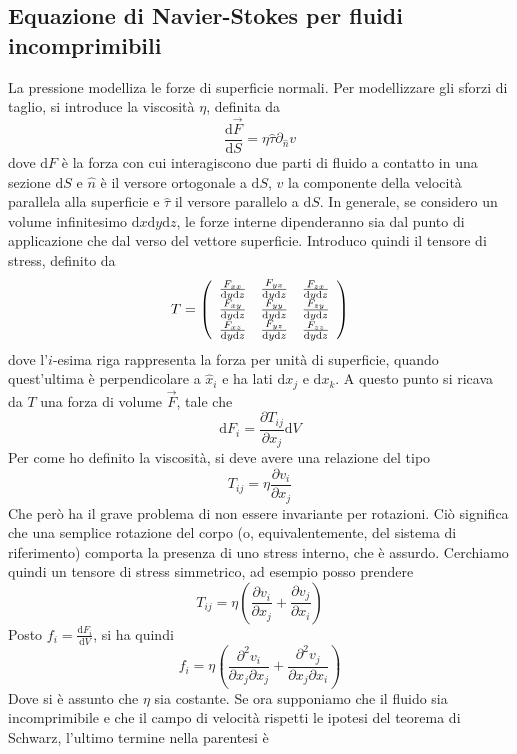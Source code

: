 \documentclass[a4paper,11pt]{article}
\begin{document}
\subsection{Equazione di Navier-Stokes per fluidi incomprimibili}
La pressione modelliza le forze di superficie normali. Per modellizzare gli sforzi di taglio, si introduce la viscosità $\eta$, definita da
\[\frac{\mathrm{d}\vec F}{\mathrm{d}S}=\eta\hat{\tau}\partial_{\hat n}v\]
dove $\mathrm{d}F$ è la forza con cui interagiscono due parti di fluido a contatto in una sezione $\mathrm{d}S$ e $\hat n$ è il versore ortogonale a $\mathrm{d}S$, $v$ la componente della velocità parallela alla superficie e $\hat{\tau}$ il versore parallelo a $\mathrm{d}S$. In generale, se considero un volume infinitesimo $\mathrm{d}x\mathrm{d}y\mathrm{d}z$, le forze interne dipenderanno sia dal punto di applicazione che dal verso del vettore superficie. Introduco quindi il tensore di stress, definito da
\[T=\left(\begin{array}{c c c}
\frac{F_{xx}}{\mathrm{d}y\mathrm{d}z} & \frac{F_{yx}}{\mathrm{d}y\mathrm{d}z} & \frac{F_{zx}}{\mathrm{d}y\mathrm{d}z} \\
\frac{F_{xy}}{\mathrm{d}y\mathrm{d}z} & \frac{F_{yy}}{\mathrm{d}y\mathrm{d}z} & \frac{F_{zy}}{\mathrm{d}y\mathrm{d}z} \\
\frac{F_{xz}}{\mathrm{d}y\mathrm{d}z} & \frac{F_{yz}}{\mathrm{d}y\mathrm{d}z} & \frac{F_{zz}}{\mathrm{d}y\mathrm{d}z} \end{array}\right)\]
dove l'$i$-esima riga rappresenta la forza per unità di superficie, quando quest'ultima è perpendicolare a $\hat{x}_i$ e ha lati $\mathrm{d}x_j$ e $\mathrm{d}x_k$. A questo punto si ricava da $T$ una forza di volume $\vec F$, tale che
\[\mathrm{d}F_i=\frac{\partial T_{ij}}{\partial x_j}\mathrm{d}V\]
Per come ho definito la viscosità, si deve avere una relazione del tipo
\[T_{ij}=\eta\frac{\partial v_i}{\partial x_j}\]
Che però ha il grave problema di non essere invariante per rotazioni. Ciò significa che una semplice rotazione del corpo (o, equivalentemente, del sistema di riferimento) comporta la presenza di uno stress interno, che è assurdo. Cerchiamo quindi un tensore di stress simmetrico, ad esempio posso prendere
\[T_{ij}=\eta\left(\frac{\partial v_i}{\partial x_j}+\frac{\partial v_j}{\partial x_i}\right)\]
Posto $f_i=\frac{\mathrm{d}F_i}{\mathrm{d}V}$, si ha quindi
\[f_i=\eta\left(\frac{\partial^2v_i}{\partial x_j\partial x_j}+\frac{\partial^2v_j}{\partial x_j\partial x_i}\right)\]
Dove si è assunto che $\eta$ sia costante. Se ora supponiamo che il fluido sia incomprimibile e che il campo di velocità rispetti le ipotesi del teorema di Schwarz, l'ultimo termine nella parentesi è
\end{document}
